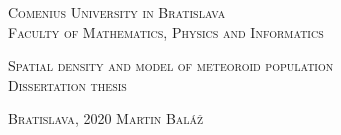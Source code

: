 \begin{titlepage}    
    \begin{center}
        {
            \Large
            \textsc{Comenius University in Bratislava}\\[2mm]
            \textsc{Faculty of Mathematics, Physics and Informatics}\\[12mm]
        }
                
		    \vspace{50mm}

        {
            \linespread{1.2}
            \fontsize{30}{30}\selectfont
            \textsc{Spatial density and model of meteoroid population}\\[10mm]
            
            \large
            \textsc{Dissertation thesis}
        }        
        
		
        \vfill
		{						
            \large
			\textsc{Bratislava}, 2020 \hfill \textsc{Martin Baláž}
		}
    \end{center}
\end{titlepage}
